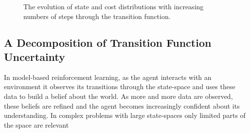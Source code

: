 \begin{figure}[H]

\caption[Evolution of state and cost distributions]{The evolution of state and cost distributions with increasing numbers of steps through the transition function.}
\label{Fig:Re-evolution-of-state-and-cost} 
\end{figure}

\subsection{A Decomposition of Transition Function Uncertainty}
In model-based reinforcement learning, as the agent interacts with an environment it observes its transitions through the state-space and uses these data to build a belief about the world. As more and more data are observed, these beliefs are refined and the agent becomes increasingly confident about its understanding. In complex problems with large state-spaces only limited parts of the space are relevant 

